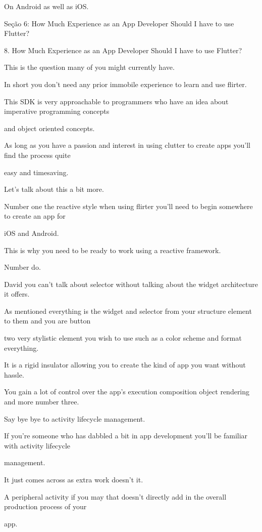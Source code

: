 On Android as well as iOS.

Seção 6: How Much Experience as an App Developer
Should I have to use Flutter?

8. How Much Experience as an App Developer Should I
have to use Flutter?

This is the question many of you might currently have.

In short you don't need any prior immobile experience to learn and use flirter.

This SDK is very approachable to programmers who have an idea about imperative programming concepts

and object oriented concepts.

As long as you have a passion and interest in using clutter to create apps you'll find the process quite

easy and timesaving.

Let's talk about this a bit more.

Number one the reactive style when using flirter you'll need to begin somewhere to create an app for

iOS and Android.

This is why you need to be ready to work using a reactive framework.

Number do.

David you can't talk about selector without talking about the widget architecture it offers.

As mentioned everything is the widget and selector from your structure element to them and you are button

two very stylistic element you wish to use such as a color scheme and format everything.

It is a rigid insulator allowing you to create the kind of app you want without hassle.

You gain a lot of control over the app's execution composition object rendering and more number three.

Say bye bye to activity lifecycle management.

If you're someone who has dabbled a bit in app development you'll be familiar with activity lifecycle

management.

It just comes across as extra work doesn't it.

A peripheral activity if you may that doesn't directly add in the overall production process of your

app.

